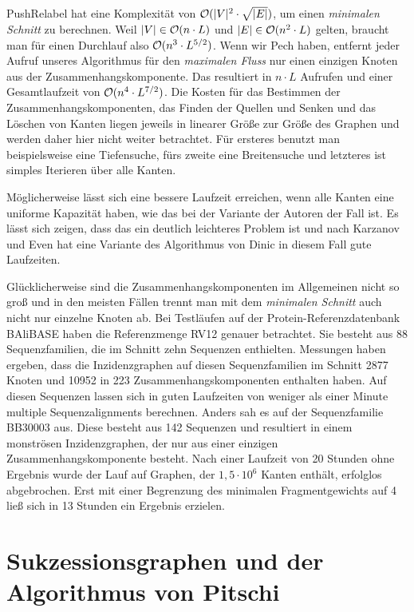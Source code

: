 \textrm{PushRelabel} hat eine Komplexität von $\mathcal{O}(|V|^2\cdot \sqrt{|E|})$, um einen \emph{minimalen Schnitt} zu berechnen. Weil $|V| \in \mathcal{O}(n\cdot L)$ und $|E| \in \mathcal{O}(n^2\cdot L)$ gelten, braucht man für einen Durchlauf also $\mathcal{O}(n^3\cdot L^{5/2})$. Wenn wir Pech haben, entfernt jeder Aufruf unseres Algorithmus für den \emph{maximalen Fluss} nur einen einzigen Knoten aus der Zusammenhangskomponente. Das resultiert in $n\cdot L$ Aufrufen und einer Gesamtlaufzeit von $\mathcal{O}(n^4\cdot L^{7/2})$. Die Kosten für das Bestimmen der Zusammenhangskomponenten, das Finden der Quellen und Senken und das Löschen von Kanten liegen jeweils in linearer Größe zur Größe des Graphen und werden daher hier nicht weiter betrachtet. Für ersteres benutzt man beispielsweise eine Tiefensuche, fürs zweite eine Breitensuche und letzteres ist simples Iterieren über alle Kanten.

Möglicherweise lässt sich eine bessere Laufzeit erreichen, wenn alle Kanten eine uniforme Kapazität haben, wie das bei der Variante der Autoren der Fall ist. Es lässt sich zeigen, dass das ein deutlich leichteres Problem ist \citep{gt14} und nach Karzanov und Even hat eine Variante des Algorithmus von Dinic in diesem Fall gute Laufzeiten.

Glücklicherweise sind die Zusammenhangskomponenten im Allgemeinen nicht so groß und in den meisten Fällen trennt man mit dem \emph{minimalen Schnitt} auch nicht nur einzelne Knoten ab. Bei Testläufen auf der Protein-Referenzdatenbank BAliBASE haben \cite{cpm10} die Referenzmenge RV12 genauer betrachtet. Sie besteht aus 88 Sequenzfamilien, die im Schnitt zehn Sequenzen enthielten. Messungen haben ergeben, dass die Inzidenzgraphen auf diesen Sequenzfamilien im Schnitt 2877 Knoten und 10952 in 223 Zusammenhangskomponenten enthalten haben. Auf diesen Sequenzen lassen sich in guten Laufzeiten von weniger als einer Minute multiple Sequenzalignments berechnen. Anders sah es auf der Sequenzfamilie BB30003 aus. Diese besteht aus 142 Sequenzen und resultiert in einem monströsen Inzidenzgraphen, der nur aus einer einzigen Zusammenhangskomponente besteht. Nach einer Laufzeit von 20 Stunden ohne Ergebnis wurde der Lauf auf Graphen, der $1,5\cdot 10^6$ Kanten enthält, erfolglos abgebrochen. Erst mit einer Begrenzung des minimalen Fragmentgewichts auf 4 ließ sich in 13 Stunden ein Ergebnis erzielen. 

\section{Sukzessionsgraphen und der Algorithmus von Pitschi}


